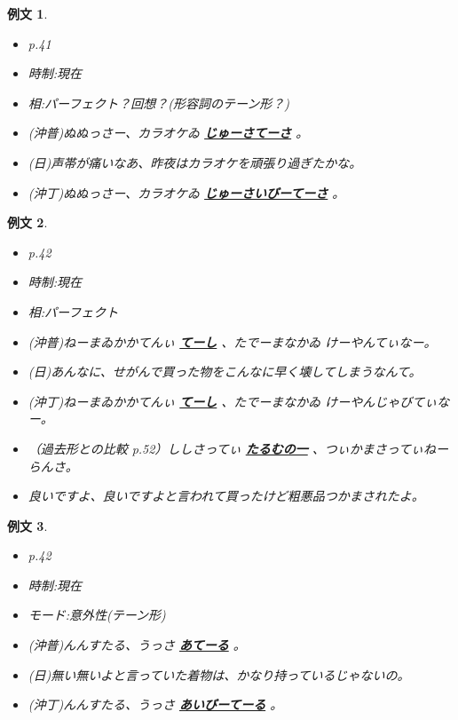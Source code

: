 \documentclass[a4j,12pt]{jarticle}
\theoremstyle{break}
\newtheorem{example}{例文}
\newcommand{\highlight}[1]{
  \textbf{\underline{#1}}
}
\begin{document}
\begin{example}
  \begin{itemize}
  \item p.41
  \item 時制:現在
  \item 相:パーフェクト？回想？(形容詞のテーン形？)
  \item (沖普)ぬぬっさー、カラオケゐ\highlight{じゅーさてーさ}。
  \item (日)声帯が痛いなあ、昨夜はカラオケを頑張り過ぎたかな。
  \item (沖丁)ぬぬっさー、カラオケゐ\highlight{じゅーさいびーてーさ}。
  \end{itemize}
\end{example}
\begin{example}
  \begin{itemize}
  \item p.42
  \item 時制:現在
  \item 相:パーフェクト
  \item (沖普)ねーまゐかかてんぃ\highlight{てーし}、たでーまなかゐ けーやんてぃなー。
  \item (日)あんなに、せがんで買った物をこんなに早く壊してしまうなんて。
  \item (沖丁)ねーまゐかかてんぃ\highlight{てーし}、たでーまなかゐ けーやんじゃびてぃなー。
  \item （過去形との比較 p.52）ししさってぃ\highlight{たるむの一}、つぃかまさってぃねーらんさ。
  \item 良いですよ、良いですよと言われて買ったけど粗悪品つかまされたよ。
  \end{itemize}
\end{example}
\begin{example}
  \begin{itemize}
  \item p.42
  \item 時制:現在
  \item モード:意外性(テーン形)
  \item (沖普)んんすたる、うっさ\highlight{あてーる}。
  \item (日)無い無いよと言っていた着物は、かなり持っているじゃないの。
  \item (沖丁)んんすたる、うっさ\highlight{あいびーてーる}。
  \end{itemize}
\end{example}
\end{document}
